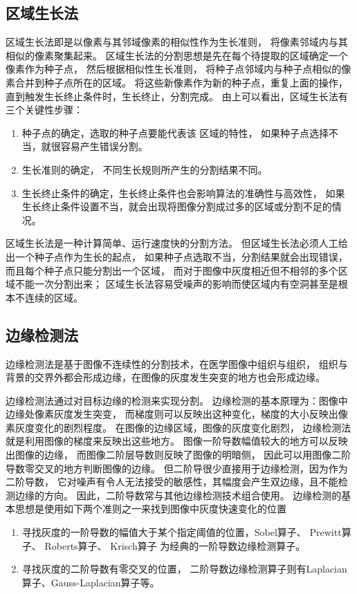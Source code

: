 \subsection{区域生长法}
区域生长法即是以像素与其邻域像素的相似性作为生长准则，
将像素邻域内与其相似的像素聚集起来。
区域生长法的分割思想是先在每个待提取的区域确定一个像素作为种子点，
然后根据相似性生长准则，
将种子点邻域内与种子点相似的像素合并到种子点所在的区域。
将这些新像素作为新的种子点，重复上面的操作，
直到触发生长终止条件时，生长终止，分割完成。
由上可以看出，区域生长法有三个关键性步骤：
\begin{enumerate}
  \item 种子点的确定，选取的种子点要能代表该 区域的特性，
    如果种子点选择不当，就很容易产生错误分割。
  \item 生长准则的确定，
    不同生长规则所产生的分割结果不同。
  \item 生长终止条件的确定，生长终止条件也会影响算法的准确性与高效性，
    如果生长终止条件设置不当，就会出现将图像分割成过多的区域或分割不足的情况。
\end{enumerate}

区域生长法是一种计算简单、运行速度快的分割方法。
但区域生长法必须人工给出一个种子点作为生长的起点，
如果种子点选取不当，分割结果就会出现错误，
而且每个种子点只能分割出一个区域，
而对于图像中灰度相近但不相邻的多个区域不能一次分割出来；
区域生长法容易受噪声的影响而使区域内有空洞甚至是根本不连续的区域。

\subsection{边缘检测法}
边缘检测法是基于图像不连续性的分割技术，在医学图像中组织与组织，
组织与背景的交界外都会形成边缘，在图像的灰度发生突变的地方也会形成边缘。

边缘检测法通过对目标边缘的检测来实现分割。
边缘检测的基本原理为：图像中边缘处像素灰度发生突变，
而梯度则可以反映出这种变化，梯度的大小反映出像素灰度变化的剧烈程度。
在图像的边缘区域，图像的灰度变化剧烈，
边缘检测法就是利用图像的梯度来反映出这些地方。
图像一阶导数幅值较大的地方可以反映出图像的边缘，
而图像二阶层导数则反映了图像的明暗侧，
因此可以用图像二阶导数零交叉的地方判断图像的边缘。
但二阶导很少直接用于边缘检测，因为作为二阶导数，
它对噪声有令人无法接受的敏感性，其幅度会产生双边缘，且不能检测边缘的方向。
因此，二阶导数常与其他边缘检测技术组合使用。
边缘检测的基本思想是使用如下两个准则之一来找到图像中灰度快速变化的位置
\begin{enumerate}
  \item 寻找灰度的一阶导数的幅值大于某个指定阈值的位置，Sobel算子、
    Prewitt算子、 Roberts算子、 Krisch算子 为经典的一阶导数边缘检测算子。
  \item 寻找灰度的二阶导数有零交叉的位置，
    二阶导数边缘检测算子则有Laplacian算子、Gauss-Laplacian算子等。
\end{enumerate}

